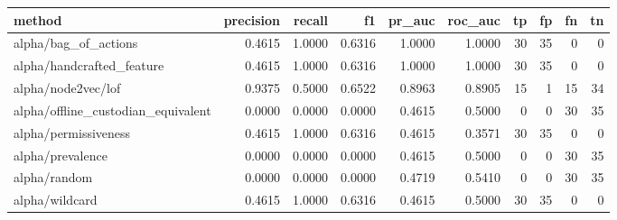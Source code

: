 \begin{tabular}{lrrrrrrrrr}
\hline
method & precision & recall & f1 & pr\_auc & roc\_auc & tp & fp & fn & tn \\
\hline
alpha/bag\_of\_actions & 0.4615 & 1.0000 & 0.6316 & 1.0000 & 1.0000 & 30 & 35 & 0 & 0 \\
alpha/handcrafted\_feature & 0.4615 & 1.0000 & 0.6316 & 1.0000 & 1.0000 & 30 & 35 & 0 & 0 \\
alpha/node2vec/lof & 0.9375 & 0.5000 & 0.6522 & 0.8963 & 0.8905 & 15 & 1 & 15 & 34 \\
alpha/offline\_custodian\_equivalent & 0.0000 & 0.0000 & 0.0000 & 0.4615 & 0.5000 & 0 & 0 & 30 & 35 \\
alpha/permissiveness & 0.4615 & 1.0000 & 0.6316 & 0.4615 & 0.3571 & 30 & 35 & 0 & 0 \\
alpha/prevalence & 0.0000 & 0.0000 & 0.0000 & 0.4615 & 0.5000 & 0 & 0 & 30 & 35 \\
alpha/random & 0.0000 & 0.0000 & 0.0000 & 0.4719 & 0.5410 & 0 & 0 & 30 & 35 \\
alpha/wildcard & 0.4615 & 1.0000 & 0.6316 & 0.4615 & 0.5000 & 30 & 35 & 0 & 0 \\
\hline
\end{tabular}
